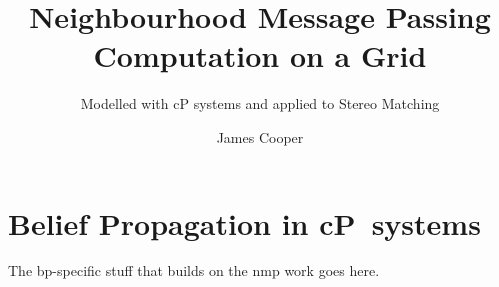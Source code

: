 \documentclass[11pt,partial,draft,doublespace]{aucklandthesis}
\begin{document}
%
%
%

\title{Neighbourhood Message Passing Computation on a Grid}
\subtitle{Modelled with cP systems and applied to Stereo Matching}
\author{James Cooper}

\maketitle




\cleardoublepage\tableofcontents
\cleardoublepage\listoffigures
\cleardoublepage\listoftables
\cleardoublepage\listoffixmes

%
%
%
%


\glsresetall

\glsresetall

\glsresetall

\glsresetall
\chapter{Belief Propagation in cP~systems}
The \gls{bp}-specific stuff that builds on the \gls{nmp} work goes here.
\glsresetall

\glsresetall
% 
% 

\glsresetall

% 
% 
\end{document}
